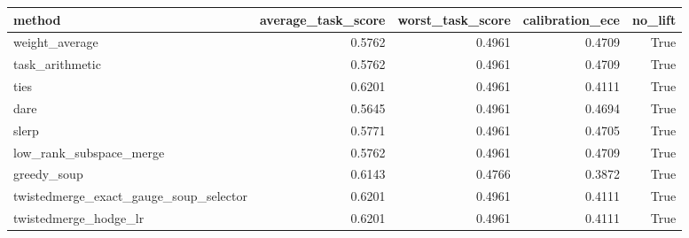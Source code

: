 \begin{tabular}{lrrrr}
\toprule
method & average_task_score & worst_task_score & calibration_ece & no_lift \\
\midrule
weight_average & 0.5762 & 0.4961 & 0.4709 & True \\
task_arithmetic & 0.5762 & 0.4961 & 0.4709 & True \\
ties & 0.6201 & 0.4961 & 0.4111 & True \\
dare & 0.5645 & 0.4961 & 0.4694 & True \\
slerp & 0.5771 & 0.4961 & 0.4705 & True \\
low_rank_subspace_merge & 0.5762 & 0.4961 & 0.4709 & True \\
greedy_soup & 0.6143 & 0.4766 & 0.3872 & True \\
twistedmerge_exact_gauge_soup_selector & 0.6201 & 0.4961 & 0.4111 & True \\
twistedmerge_hodge_lr & 0.6201 & 0.4961 & 0.4111 & True \\
\bottomrule
\end{tabular}
